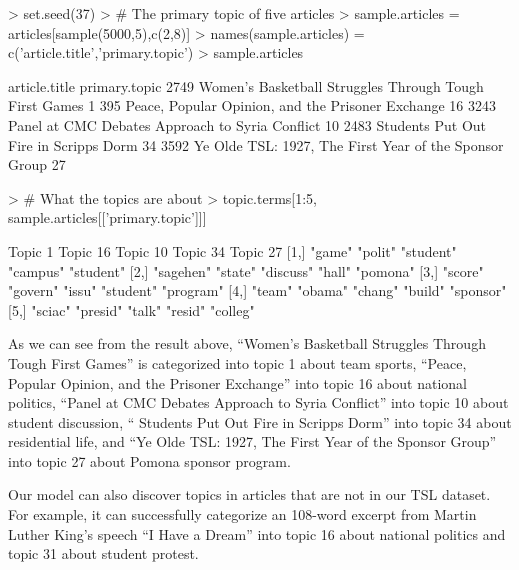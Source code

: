 \documentclass[a4paper]{article}
\begin{document}
\begin{Schunk}
\begin{Sinput}
> set.seed(37)
> # The primary topic of five articles
> sample.articles = articles[sample(5000,5),c(2,8)]
> names(sample.articles) = c('article.title','primary.topic')
> sample.articles
\end{Sinput}
\begin{Soutput}
                                              article.title primary.topic
2749 Women's Basketball Struggles Through Tough First Games             1
395       Peace, Popular Opinion, and the Prisoner Exchange            16
3243        Panel at CMC Debates Approach to Syria Conflict            10
2483                  Students Put Out Fire in Scripps Dorm            34
3592 Ye Olde TSL: 1927, The First Year of the Sponsor Group            27
\end{Soutput}
\begin{Sinput}
> # What the topics are about
> topic.terms[1:5, sample.articles[['primary.topic']]]
\end{Sinput}
\begin{Soutput}
     Topic 1   Topic 16 Topic 10  Topic 34  Topic 27 
[1,] "game"    "polit"  "student" "campus"  "student"
[2,] "sagehen" "state"  "discuss" "hall"    "pomona" 
[3,] "score"   "govern" "issu"    "student" "program"
[4,] "team"    "obama"  "chang"   "build"   "sponsor"
[5,] "sciac"   "presid" "talk"    "resid"   "colleg" 
\end{Soutput}
\end{Schunk}

As we can see from the result above, ``Women's Basketball Struggles Through Tough First Games'' is categorized into topic 1 about team sports, ``Peace, Popular Opinion, and the Prisoner Exchange'' into topic 16 about national politics, ``Panel at CMC Debates Approach to Syria Conflict'' into topic 10 about student discussion, `` Students Put Out Fire in Scripps Dorm'' into topic 34 about residential life, and ``Ye Olde TSL: 1927, The First Year of the Sponsor Group'' into topic 27 about Pomona sponsor program. 

Our model can also discover topics in articles that are not in our TSL dataset. For example, it can successfully categorize an 108-word excerpt from Martin Luther King's speech ``I Have a Dream'' into topic 16 about national politics and topic 31 about student protest.
\end{document}
